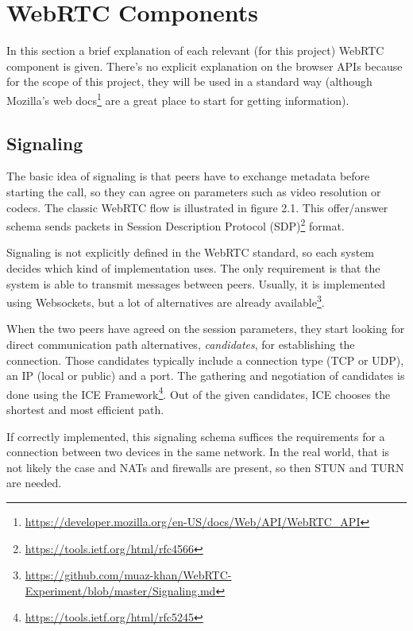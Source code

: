 \documentclass[paper=a4, fontsize=11pt]{scrartcl} %
\numberwithin{equation}{section} %
\numberwithin{figure}{section} %
\numberwithin{table}{section} %
\begin{document}
\section{WebRTC Components}

In this section a brief explanation of each relevant (for this project) WebRTC component is given. There's no explicit explanation on the browser APIs because for the scope of this project, they will be used in a standard way (although Mozilla's web docs\footnote{\url{https://developer.mozilla.org/en-US/docs/Web/API/WebRTC_API}} are a great place to start for getting information). 

\subsection{Signaling}

The basic idea of signaling is that peers have to exchange  metadata before starting the call, so they can agree on parameters such as video resolution or codecs. The classic WebRTC flow is illustrated in figure 2.1. This offer/answer schema sends packets in Session Description Protocol (SDP)\footnote{\url{https://tools.ietf.org/html/rfc4566}} format.

Signaling is not explicitly defined in the WebRTC standard, so each system decides which kind of implementation uses. The only requirement is that the system is able to transmit messages between peers. Usually, it is implemented using Websockets, but a lot of alternatives are already available\footnote{\url{https://github.com/muaz-khan/WebRTC-Experiment/blob/master/Signaling.md}}.

When the two peers have agreed on the session parameters, they start looking for direct communication path alternatives, \textit{candidates}, for establishing the connection. Those candidates typically include a connection type (TCP or UDP), an IP (local or public) and a port. The gathering and negotiation of candidates is done using the ICE Framework\footnote{\url{https://tools.ietf.org/html/rfc5245}}. Out of the given candidates, ICE chooses the shortest and most efficient path.

If correctly implemented, this signaling schema suffices the requirements for a connection between two devices in the same network. In the real world, that is not likely the case and NATs and firewalls are present, so then STUN and TURN are needed.
\end{document}
